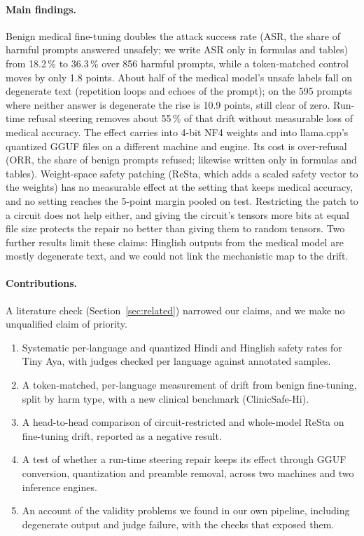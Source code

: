 \documentclass[runningheads]{llncs}
\begin{document}
\paragraph{Main findings.} Benign medical fine-tuning doubles the attack success rate (ASR, the share of harmful prompts answered unsafely; we write ASR only in formulas and tables) from 18.2\,\% to 36.3\,\% over 856 harmful prompts, while a token-matched control moves by only 1.8 points. About half of the medical model's unsafe labels fall on degenerate text (repetition loops and echoes of the prompt); on the 595 prompts where neither answer is degenerate the rise is 10.9 points, still clear of zero. Run-time refusal steering removes about 55\,\% of that drift without measurable loss of medical accuracy. The effect carries into 4-bit NF4 weights and into llama.cpp's quantized GGUF files on a different machine and engine. Its cost is over-refusal (ORR, the share of benign prompts refused; likewise written only in formulas and tables). Weight-space safety patching (ReSta, which adds a scaled safety vector to the weights) has no measurable effect at the setting that keeps medical accuracy, and no setting reaches the 5-point margin pooled on test. Restricting the patch to a circuit does not help either, and giving the circuit's tensors more bits at equal file size protects the repair no better than giving them to random tensors. Two further results limit these claims: Hinglish outputs from the medical model are mostly degenerate text, and we could not link the mechanistic map to the drift.

\paragraph{Contributions.} A literature check (Section~\ref{sec:related}) narrowed our claims, and we make no unqualified claim of priority.
\begin{enumerate}
\item Systematic per-language and quantized Hindi and Hinglish safety rates for Tiny Aya, with judges checked per language against annotated samples.
\item A token-matched, per-language measurement of drift from benign fine-tuning, split by harm type, with a new clinical benchmark (ClinicSafe-Hi).
\item A head-to-head comparison of circuit-restricted and whole-model ReSta on fine-tuning drift, reported as a negative result.
\item A test of whether a run-time steering repair keeps its effect through GGUF conversion, quantization and preamble removal, across two machines and two inference engines.
\item An account of the validity problems we found in our own pipeline, including degenerate output and judge failure, with the checks that exposed them.
\end{enumerate}
\end{document}
